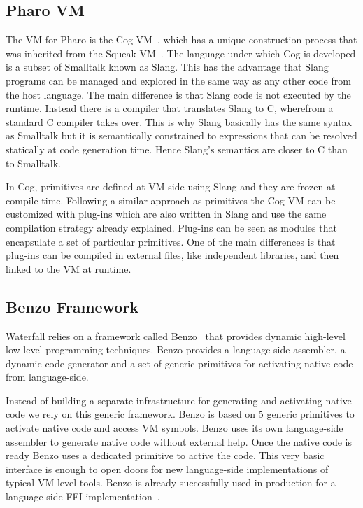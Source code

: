 \documentclass[10pt,preprint,letter]{sigplanconf}
\newcommand{\ST}  {Small\-talk\xspace}
\newcommand{\PH}  {Pharo\xspace}
\newcommand{\W}{Waterfall\xspace}
\newcommand{\B}{Benzo\xspace}
\begin{document}
\subsection{\PH VM}
The VM for \PH is the Cog VM~\cite{Mira11a}, which has a unique construction process that was inherited from the Squeak VM~\cite{Inga97a}. 
The language under which Cog is developed is a subset of \ST known as Slang. 
This has the advantage that Slang programs can be managed and explored in the same way as any other code from the host language. 
The main difference is that Slang code is not executed by the runtime.
Instead there is a compiler that translates Slang to C, wherefrom a standard C compiler takes over.
This is why Slang basically has the same syntax as \ST but it is semantically constrained to expressions that can be resolved statically at code generation time.
Hence Slang’s semantics are closer to C than to \ST.

In Cog, primitives are defined at VM-side using Slang and they are frozen at compile time.
Following a similar approach as primitives the Cog VM can be customized with plug-ins which are also written in Slang and use the same compilation strategy already explained. 
Plug-ins can be seen as modules that encapsulate a set of particular primitives.
One of the main differences is that plug-ins can be compiled in external files, like independent libraries, and then linked to the VM at runtime.

\subsection{\B Framework}
\W relies on a framework called \B~\cite{Benzo13} that provides dynamic high-level low-level programming techniques.
\B provides a language-side assembler, a dynamic code generator and a set of generic primitives for activating native code from language-side.

Instead of building a separate infrastructure for generating and activating native code we rely on this generic framework.
\B is based on 5 generic primitives to activate native code and access VM symbols.
\B uses its own language-side assembler to generate native code without external help.
Once the native code is ready \B uses a dedicated primitive to active the code.
This very basic interface is enough to open doors for new language-side implementations of typical VM-level tools.
\B is already successfully used in production for a language-side FFI implementation~\cite{Brun13a}.
\end{document}

